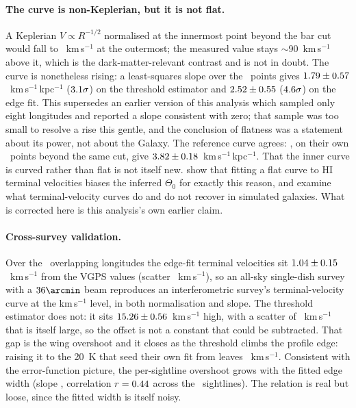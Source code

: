 \documentclass[twocolumn]{aastex631}
\begin{document}
\paragraph{The curve is non-Keplerian, but it is not flat.} A Keplerian $V\propto R^{-1/2}$
normalised at the innermost point beyond the bar cut would fall to \hiRealKepler~km\,s$^{-1}$ at the
outermost; the measured value stays $\sim$90~km\,s$^{-1}$ above it, which is the dark-matter-relevant
contrast and is not in doubt. The curve is nonetheless rising: a least-squares slope over the
\hiRealNflat\ points gives $1.79\pm0.57$~km\,s$^{-1}$\,kpc$^{-1}$
($3.1\sigma$) on the threshold estimator and
$2.52\pm0.55$ ($4.6\sigma$) on the edge fit. This
supersedes an earlier version of this analysis which sampled only eight longitudes and reported a
slope consistent with zero; that sample was too small to resolve a rise this gentle, and the
conclusion of flatness was a statement about its power, not about the Galaxy. The reference curve
agrees: \citet{mccluregriffiths2016}, on their own \hiRealRefSlopeN\ points beyond the same cut, give
$3.82\pm0.18$~km\,s$^{-1}$\,kpc$^{-1}$. That the inner curve is
curved rather than flat is not itself new. \citet{reiddame2016} show that fitting a flat
curve to HI terminal velocities biases the inferred $\Theta_0$ for exactly this reason, and
\citet{davis2026} examine what terminal-velocity curves do and do not recover in simulated
galaxies. What is corrected here is this analysis's own earlier claim.

\paragraph{Cross-survey validation.} Over the \hiRealRefN\ overlapping longitudes the edge-fit
terminal velocities sit
$1.04\pm0.15$~km\,s$^{-1}$ from the VGPS values
(scatter \hiRealRefEdgeOffsetSd~km\,s$^{-1}$), so an all-sky single-dish survey with a $36\arcmin$
beam reproduces an interferometric survey's terminal-velocity curve at the km\,s$^{-1}$ level, in
both normalisation and slope. The threshold estimator does not: it sits
$15.26\pm0.56$~km\,s$^{-1}$ high, with a scatter of
\hiRealRefThrOffsetSd~km\,s$^{-1}$ that is itself large, so the offset is not a constant that
could be subtracted. That gap is the wing overshoot and it closes as the threshold climbs the profile
edge: raising it to the 20~K that \citet{mccluregriffiths2016} seed their own fit from leaves
\hiRealSweepRefTwenty~km\,s$^{-1}$. Consistent with the error-function picture, the per-sightline
overshoot grows with the fitted edge width (slope \hiRealWidthSlope, correlation
$r=0.44$ across the \hiNlong\ sightlines). The relation is real but loose, since the
fitted width is itself noisy.
\end{document}
